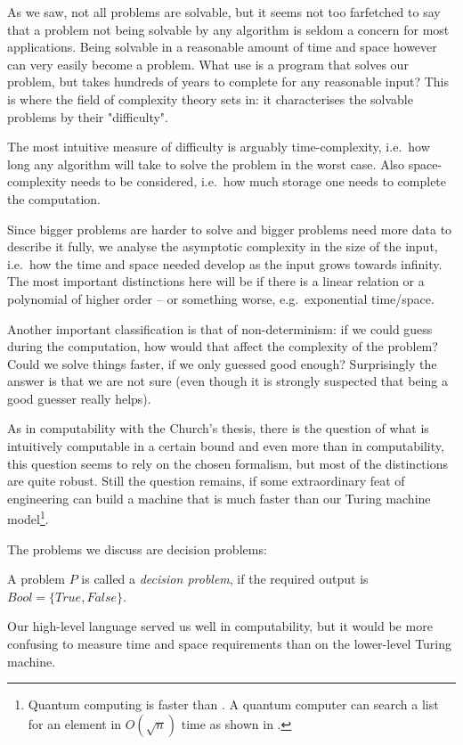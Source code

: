 As we saw, not all problems are solvable, but it seems not too farfetched to
say that a problem not being solvable by any algorithm is seldom a concern for
most applications. Being solvable in a reasonable amount of time and space
however can very easily become a problem. What use is a program that solves our
problem, but takes hundreds of years to complete for any reasonable input? This
is where the field of complexity theory sets in: it characterises the solvable
problems by their "difficulty".

The most intuitive measure of difficulty is arguably time-complexity, i.e.\ how
long any algorithm will take to solve the problem in the worst case. Also
space-complexity needs to be considered, i.e.\ how much storage one needs to
complete the computation.

Since bigger problems are harder to solve and bigger problems need more data to
describe it fully, we analyse the asymptotic complexity in the size of the
input, i.e.\ how the time and space needed develop as the input grows towards
infinity. The most important distinctions here will be if there is a linear
relation or a polynomial of higher order -- or something worse, e.g.\ exponential
time/space.

Another important classification is that of non-determinism: if we could guess
during the computation, how would that affect the complexity of the problem?
Could we solve things faster, if we only guessed good enough? Surprisingly the
answer is that we are not sure (even though it is strongly suspected that being
a good guesser really helps).

As in computability with the Church's thesis, there is the question of what is
intuitively computable in a certain bound and even more than in computability,
this question seems to rely on the chosen formalism, but most of the
distinctions are quite robust. Still the question remains, if some
extraordinary feat of engineering can build a machine that is much faster than
our Turing machine model\footnote{Quantum computing is faster than \TM\@. A 
	quantum computer can search a list for an element in $O(\sqrt{n})$ time as 
	shown in \cite{grover1996fast}.}. 

The problems we discuss are decision problems:
\begin{defn}
	A problem $P$ is called a \emph{decision problem}, if the required output is 
	$Bool = \{True, False\}$.
\end{defn}

Our high-level \WHILE language served us well in computability, but it would
be more confusing to measure time and space requirements than on the
lower-level Turing machine.

